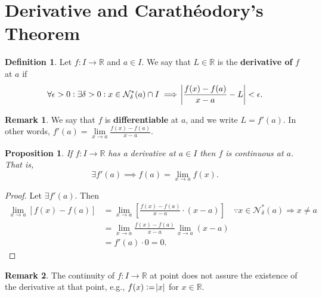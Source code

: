 \documentclass[12pt,openany]{book}
\newtheorem{proposition}[theorem]{Proposition}
\theoremstyle{definition}
\newtheorem{definition}{Definition}[chapter]
\newtheorem{remark}{Remark}[chapter]
\newcommand{\R}{\mathbb{R}}
\newcommand{\eg}{\textnormal{e.g.}}
\newcommand{\nbhd}{\mathcal{N}}
\newcommand{\Caratheodroy}{Carath\'{e}odory}
\begin{document}
	\section{Derivative and \Caratheodroy's Theorem}
	\begin{tcolorbox}[colback=white,colframe=defcolor,arc=5pt,title={\color{white}\bf Derivative}]
		\begin{definition}
			Let $f:I\to\R$ and $a\in I$. We say that $L\in\R$ is the \textbf{derivative of} $f$ at $a$ if \[
			\forall\epsilon>0:\exists\delta>0:x\in\nbhd_\delta^*(a)\cap I\implies\abs{\frac{f(x)-f(a)}{x-a}-L}<\epsilon.
			\]
		\end{definition}
	\end{tcolorbox}
	\begin{remark}
		We say that $f$ is \textbf{differentiable} at $a$, and we write $L=f'(a)$. In other words, $\displaystyle f'(a)=\lim\limits_{x\to a} \frac{f(x)-f(a)}{x-a}$.
	\end{remark}
	\vspace{8pt}
	\begin{tcolorbox}[colback=white,colframe=procolor,arc=5pt,title={\color{white}\bf }]
		\begin{proposition}
			If $f:I\to\R$ has a derivative at $a\in I$ then $f$ is continuous at $a$. That is, \[
			\exists f'(a)\implies f(a)=\lim\limits_{x\to a}f(x).
			\]
		\end{proposition}
	\end{tcolorbox}
	\begin{proof}
		Let $\exists f'(a)$. Then \begin{align*}
			\lim\limits_{x\to a} [f(x)-f(a)]&=\lim\limits_{x\to a}\left[\frac{f(x)-f(a)}{x-a}\cdot (x-a)\right]\quad\because x\in\nbhd_\delta^*(a)\Rightarrow x\neq a\\
			&=\lim\limits_{x\to a}\frac{f(x)-f(a)}{x-a}\lim\limits_{x\to a}(x-a)\\
			&=f'(a)\cdot 0=0.
		\end{align*}
	\end{proof}
	\vspace{4pt}
	\begin{remark}
		The continuity of $f:I\to\R$ at point does not assure the existence of the derivative at that point, \eg, $f(x):=\abs{x}$ for $x\in\R$.
	\end{remark}
	
\end{document}
